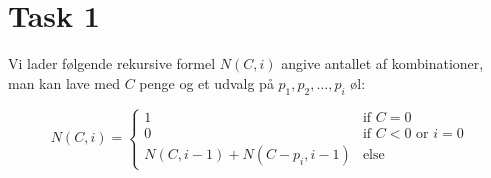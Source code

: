 \section{Task 1}

Vi lader følgende rekursive formel $N(C, i)$ angive antallet af kombinationer, man kan lave med $C$ penge og et udvalg på $p_1, p_2, ..., p_i$ øl:

$$N(C, i) = \begin{cases}
  1 & \text{if } C = 0 \\
  0 & \text{if } C < 0 \text{ or } i = 0 \\
  N(C, i-1) + N(C-p_i, i-1) & \text{else }
\end{cases}
$$

